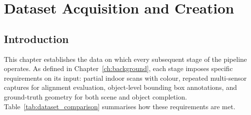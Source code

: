 \cleardoublepage
{}
\cleardoublepage

\chapter{Dataset Acquisition and Creation}
\label{ch:3_Data_Acquisition}




\section{Introduction}
\label{sec:3_intro}
 
This chapter establishes the data on which every subsequent stage of the pipeline operates. As defined in Chapter~\ref{ch:background}, each stage imposes specific requirements on its input: partial indoor scans with colour, repeated multi-sensor captures for alignment evaluation, object-level bounding box annotations, and ground-truth geometry for both scene and object completion. Table~\ref{tab:dataset_comparison} summarises how these requirements are met.
 
